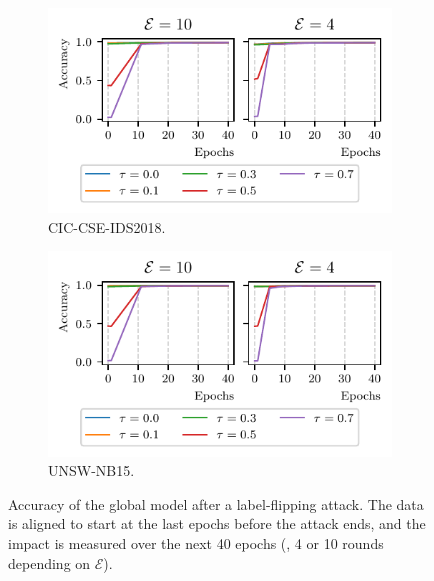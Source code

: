 \begin{figure}
  \centering
  \begin{subfigure}{.49\linewidth}
    \centering
    \includegraphics[width=\linewidth]{figures/cicids/redemption}
    \caption{
      CIC-CSE-IDS2018.
      \label{fig:assess.hyperparams-redemption.cicids}
    }
  \end{subfigure}
  \hfill
  \begin{subfigure}{.49\linewidth}
    \centering
    \includegraphics[width=\linewidth]{figures/nb15/redemption}
    \caption{
      UNSW-NB15.
      \label{fig:assess.hyperparams-redemption.nb15}
    }
  \end{subfigure}
  \caption[
    Accuracy of the global model after a label-flipping attack.
  ]{
    Accuracy of the global model after a label-flipping attack.
    The data is aligned to start at the last epochs before the attack ends, and the impact is measured over the next 40 epochs (\ie, 4 or 10 rounds depending on $\mathcal{E}$).
  }
  \label{fig:assess.hyperparams-redemption}
\end{figure}


